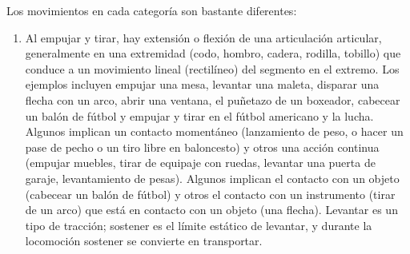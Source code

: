\documentclass[12pt]{book}
\begin{document}
Los movimientos en cada categoría son bastante diferentes:
\begin{enumerate}
    \item[1.] Al empujar y tirar, hay extensión o flexión de una articulación articular, generalmente en una extremidad (codo, hombro, cadera, rodilla, tobillo) que conduce a un movimiento lineal (rectilíneo) del segmento en el extremo. Los ejemplos incluyen empujar una mesa, levantar una maleta, disparar una flecha con un arco, abrir una ventana, el puñetazo de un boxeador, cabecear un balón de fútbol y empujar y tirar en el fútbol americano y la lucha. Algunos implican un contacto momentáneo (lanzamiento de peso, o hacer un pase de pecho o un tiro libre en baloncesto) y otros una acción continua (empujar muebles, tirar de equipaje con ruedas, levantar una puerta de garaje, levantamiento de pesas). Algunos implican el contacto con un objeto (cabecear un balón de fútbol) y otros el contacto con un instrumento (tirar de un arco) que está en contacto con un objeto (una flecha). Levantar es un tipo de tracción; sostener es el límite estático de levantar, y durante la locomoción sostener se convierte en transportar.
    

\end{enumerate}
\end{document}
